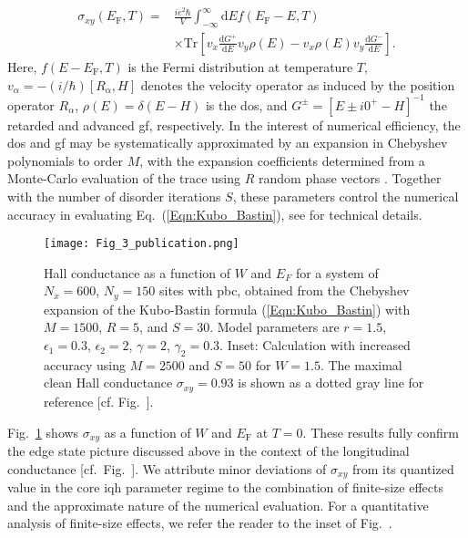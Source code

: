 \documentclass[aps,prl,amsmath,amssymb,twocolumn, superscriptaddress]{revtex4-2}
\newcommand{\eq}[1]{Eq.~(\ref{#1})}
\begin{document}
\begin{align}
\sigma_{xy}(E_\mathrm{F}, T) =& \frac{ie^2 \hbar}{V} \int_{-\infty}^\infty \mathrm{d} E f(E_\mathrm{F} - E, T)  \nonumber \\ &\times \mathrm{Tr}\left[v_x \frac{\mathrm{d} G^+}{\mathrm{d} E} v_y \rho(E) 
 - v_x  \rho(E) v_y \frac{\mathrm{d} G^-}{\mathrm{d} E}   \right].\label{Eqn:Kubo_Bastin}
\end{align}
Here, $f(E - E_\mathrm{F}, T)$ is the Fermi distribution at temperature $T$, $v_\alpha = -(i/ \hbar) [R_\alpha, H]$ denotes the velocity operator as induced by the position operator $R_\alpha$, $\rho(E) = \delta(E - H)$ is the \gls{dos}, and $G^{\pm} = [E \pm i 0^+ - H]^{-1}$ the retarded and advanced \gls{gf}, respectively. In the interest of numerical efficiency, the \gls{dos} and \gls{gf} may be systematically approximated by an expansion in Chebyshev polynomials to order $M$, with the expansion coefficients determined from a Monte-Carlo evaluation of the trace using $R$ random phase vectors \cite{Kubo_Bastin_KPM_1, Kubo_Bastin_KPM_2, KPM_Review}. Together with the number of disorder iterations $S$, these parameters control the numerical accuracy in evaluating \eq{Eqn:Kubo_Bastin}, see \cite{Supplemental} for technical details.

\begin{figure}[htp!]	 
{\texttt{[image: Fig\_3\_publication.png]}}
\caption{Hall conductance as a function of $W$ and $E_F$ for a system of $N_x = 600$, $N_y = 150$ sites with \gls{pbc}, obtained from the Chebyshev expansion of the Kubo-Bastin formula (\ref{Eqn:Kubo_Bastin}) with $M = 1500$, $R = 5$, and $S = 30$. Model parameters are $r = 1.5$, $\epsilon_1 = 0.3$, $\epsilon_2 = 2$, $\gamma  =2$, $\gamma_2 = 0.3$. Inset: Calculation with increased accuracy using $M = 2500$ and $S = 50$ for $W = 1.5$. The maximal clean Hall conductance $\sigma_{xy} = 0.93$ is shown as a dotted gray line for reference [cf.  Fig.~\protect{}].
}\label{Fig:Hall_cond}
\end{figure}

Fig.~\ref{Fig:Hall_cond} shows $\sigma_{xy}$ as a function of $W$ and $E_\mathrm{F}$ at $T = 0$. These results fully confirm the edge state picture discussed above in the context of the longitudinal conductance [cf.~Fig.~]. We attribute minor deviations of $\sigma_{xy}$ from its quantized value in the core \gls{iqh} parameter regime to the combination of finite-size effects and the approximate nature of the numerical evaluation. For a quantitative analysis of finite-size effects, we refer the reader to the inset of Fig.~.
\end{document}
